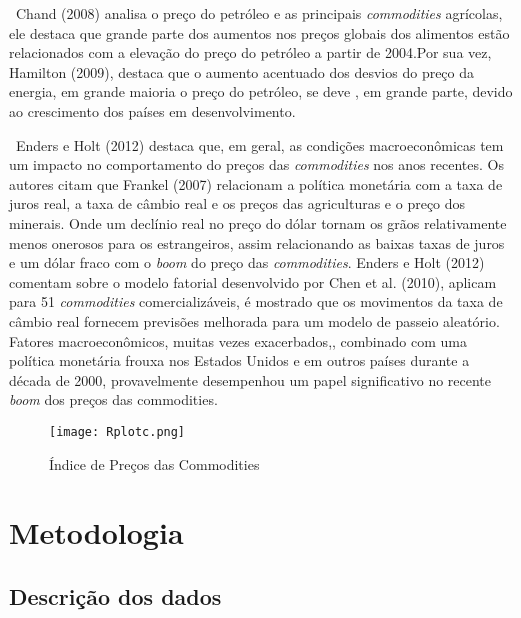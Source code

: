 \documentclass[a4paper,12pt,oneside,titlepage]{article}
\begin{document}
\ Chand (2008) analisa o preço do petróleo e as principais \textit{commodities} agrícolas, ele destaca que grande parte dos aumentos nos preços globais dos alimentos estão relacionados com a elevação do preço do petróleo a partir de 2004.Por sua vez,  Hamilton (2009), destaca que o aumento acentuado dos desvios do preço da energia, em grande maioria o preço do petróleo, se deve , em grande parte, devido ao crescimento dos países em desenvolvimento. 

\ Enders e Holt (2012) destaca que, em geral, as condições macroeconômicas tem um impacto no comportamento do preços das \textit{commodities} nos anos recentes. Os autores citam que Frankel (2007) relacionam a política monetária com a taxa de juros real, a taxa de câmbio real e os preços das agriculturas e o preço dos minerais. Onde um declínio real no preço do dólar tornam os grãos relativamente menos onerosos para os estrangeiros, assim relacionando as baixas taxas de juros e um dólar fraco com o \textit{boom} do preço das \textit{commodities}. Enders e Holt (2012) comentam sobre o modelo fatorial desenvolvido por Chen et al. (2010), aplicam para 51 \textit{commodities} comercializáveis, é mostrado que os movimentos da taxa de câmbio real fornecem previsões melhorada para um modelo de passeio aleatório. Fatores macroeconômicos, muitas vezes exacerbados,, combinado com uma política monetária frouxa nos Estados Unidos e em outros países durante a década de 2000, provavelmente desempenhou um papel significativo no recente \textit{boom} dos preços das commodities.    

\label{lit}

\begin{figure}[H]
	\caption{Índice de Preços das Commodities }
	\texttt{[image: Rplotc.png]}
	\label{ccc}
\end{figure}


\section{Metodologia}
\label{metod}

\subsection{Descrição dos dados}
\end{document}
